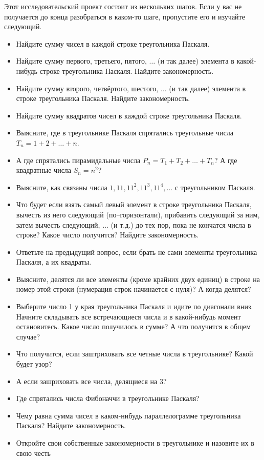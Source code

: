 \documentclass[10pt]{scrbook} \usepackage{modules/nonstahp_book}
\begin{document}

Этот исследовательский проект состоит из нескольких шагов. Если у вас не получается до конца разобраться в каком-то шаге, пропустите его и изучайте следующий.

\begin{itemize}
\item Найдите сумму чисел в каждой строке треугольника Паскаля.
\item Найдите сумму первого, третьего, пятого, $\ldots$ (и так далее) элемента в какой-нибудь строке треугольника Паскаля. Найдите закономерность.
\item Найдите сумму второго, четвёртого, шестого, $\ldots$ (и так далее) элемента в строке треугольника Паскаля. Найдите закономерность.
\item Найдите сумму квадратов чисел в каждой строке треугольника Паскаля.
\item Выясните, где в треугольнике Паскаля спрятались треугольные числа $T_n = 1+2+\ldots + n$. 
\item А где спрятались пирамидальные числа $P_n = T_1 + T_2 + \ldots + T_n$? А где квадратные числа $S_n = n^2$?
\item Выясните, как связаны числа $1, 11, 11^2, 11^3, 11^4, \ldots$ с треугольником Паскаля.
\item Что будет если взять самый левый элемент в строке треугольника Паскаля, вычесть из него следующий (по--горизонтали), прибавить следующий за ним, затем вычесть следующий, $\ldots$ (и т.д.) до тех пор, пока не кончатся числа в строке? Какое число получится? Найдите закономерность.
\item Ответьте на предыдущий вопрос, если брать не сами элементы треугольника Паскаля, а их квадраты.
\item Выясните, делятся ли все элементы (кроме крайних двух единиц) в строке на номер этой строки (нумерация строк начинается с нуля)? А когда делятся? 
\item Выберите число 1 у края треугольника Паскаля и идите по диагонали вниз. Начните складывать все встречающиеся числа и в какой-нибудь момент остановитесь. Какое число получилось в сумме? А что получится в общем случае?
\item Что получится, если заштриховать все четные числа в треугольнике? Какой будет узор?
\item А если зашриховать все числа, делящиеся на 3?
\item Где спрятались числа Фибоначчи в треугольнике Паскаля?
\item Чему равна сумма чисел в каком-нибудь параллелограмме треугольника Паскаля? Найдите закономерность.
\item Откройте свои собственные закономерности в треугольнике и назовите их в свою честь
\end{itemize}
\end{document}
